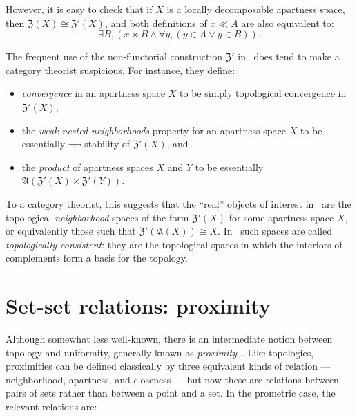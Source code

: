 \documentclass{article}
\let\implies\Rightarrow
\def\anti{\mathfrak{A}}
\def\neigh{\mathfrak{Z}}
\def\nn{\ensuremath{\neg\neg}}
\begin{document}
However, it is easy to check that if $X$ is a locally decomposable apartness space, then $\neigh(X) \cong \neigh'(X)$, and both definitions of $x\ll A$ are also equivalent to:
\begin{equation}
  \exists B, (x\bowtie B \land \forall y, (y\in A \lor y\in B)).\label{eq:top-bowtie-ll-2}
\end{equation}

\begin{rmk}
  The frequent use of the non-functorial construction $\neigh'$ in~\cite[Chapter 2]{bridges-vita} does tend to make a category theorist suspicious.
  For instance, they define:
  \begin{itemize}
  \item \emph{convergence} in an apartness space $X$ to be simply topological convergence in $\neigh'(X)$,
  \item the \emph{weak nested neighborhoods} property for an apartness space $X$ to be essentially \nn-stability of $\neigh'(X)$, and
  \item the \emph{product} of apartness spaces $X$ and $Y$ to be essentially $\anti(\neigh'(X) \times \neigh'(Y))$.
  \end{itemize}
  To a category theorist, this suggests that the ``real'' objects of interest in~\cite[Chapter 2]{bridges-vita} are the topological \emph{neighborhood} spaces of the form $\neigh'(X)$ for some apartness space $X$, or equivalently those such that $\neigh'(\anti(X))\cong X$.
  In~\cite{bridges-vita} such spaces are called \emph{topologically consistent}: they are the topological spaces in which the interiors of complements form a basis for the topology.
\end{rmk}


\section{Set-set relations: proximity}
\label{sec:set-set}
\label{sec:proximity}

Although somewhat less well-known, there is an intermediate notion between topology and uniformity, generally known as \emph{proximity}~\cite{proximity-spaces}.
Like topologies, proximities can be defined classically by three equivalent kinds of relation --- neighborhood, apartness, and closeness --- but now these are relations between pairs of sets rather than between a point and a set.
In the prometric case, the relevant relations are:
\end{document}
